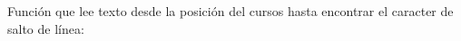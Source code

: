 
\question Función que lee texto desde la posición del cursos hasta encontrar
          el caracter de salto de línea:
          \fillin[readline()]

